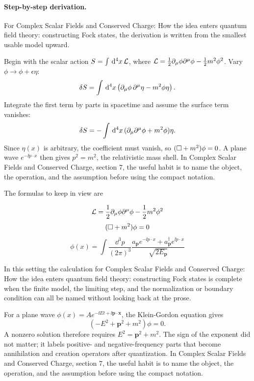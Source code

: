 \paragraph{Step-by-step derivation.}

For Complex Scalar Fields and Conserved Charge: How the idea enters quantum field theory: constructing Fock states, the derivation is written from the smallest usable model upward.

Begin with the scalar action \(S=\int\,\mathrm d^4x\,\mathcal L\), where \(\mathcal L=\frac12\partial_\mu\phi\partial^\mu\phi-\frac12m^2\phi^2\).  Vary \(\phi\to\phi+\epsilon\eta\):
\[
  \delta S=\int\,\mathrm d^4x\left(\partial_\mu\phi\,\partial^\mu\eta-m^2\phi\eta\right).
\]
Integrate the first term by parts in spacetime and assume the surface term vanishes:
\[
  \delta S=-\int\,\mathrm d^4x\,(\partial_\mu\partial^\mu\phi+m^2\phi)\eta.
\]
Since \(\eta(x)\) is arbitrary, the coefficient must vanish, so \((\Box+m^2)\phi=0\).  A plane wave \(e^{-\ii p\cdot x}\) then gives \(p^2=m^2\), the relativistic mass shell.  In Complex Scalar Fields and Conserved Charge, section 7, the useful habit is to name the object, the operation, and the assumption before using the compact notation.

The formulas to keep in view are

\[
  \mathcal L=\frac12\partial_\mu\phi\partial^\mu\phi-\frac12m^2\phi^2
\]
\[
  (\Box+m^2)\phi=0
\]
\[
  \phi(x)=\int\frac{\dd^3p}{(2\pi)^3}\frac{a_{\bm p}e^{-\ii p\cdot x}+a_{\bm p}^\dagger e^{\ii p\cdot x}}{\sqrt{2E_{\bm p}}}
\]

In this setting the calculation for Complex Scalar Fields and Conserved Charge: How the idea enters quantum field theory: constructing Fock states is complete when the finite model, the limiting step, and the normalization or boundary condition can all be named without looking back at the prose.




\begin{example}
For a plane wave \(\phi(x)=Ae^{-\ii Et+\ii\bm p\cdot\bm x}\), the Klein-Gordon equation gives
\[
  (-E^2+\bm p^2+m^2)\phi=0.
\]
A nonzero solution therefore requires \(E^2=\bm p^2+m^2\).  The sign of the exponent did not matter; it labels positive- and negative-frequency parts that become annihilation and creation operators after quantization.  In Complex Scalar Fields and Conserved Charge, section 7, the useful habit is to name the object, the operation, and the assumption before using the compact notation.
\end{example}



